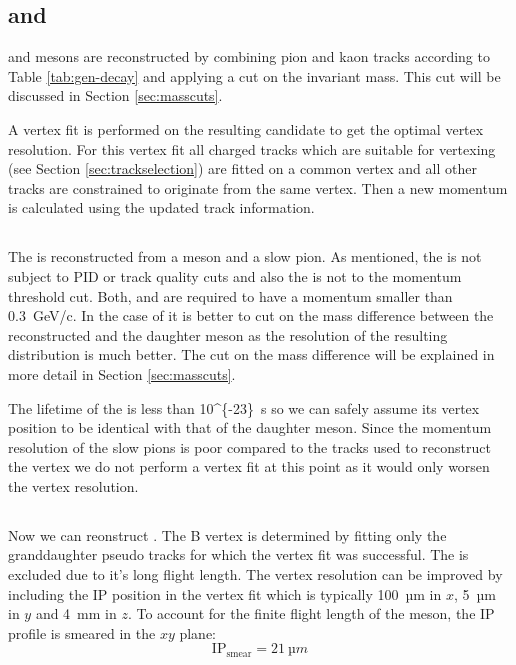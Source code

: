 \documentclass[a4paper]{report}
\begin{document}
\subsection{\PDz and \PDpm}
\PDz and \PDpm mesons are reconstructed by combining pion and kaon tracks
according to Table \ref{tab:gen-decay} and applying a cut on the invariant mass.
This cut will be discussed in Section \ref{sec:masscuts}.

A vertex fit is performed on the resulting \PD candidate to get the optimal
vertex resolution.  For this vertex fit all charged tracks which are suitable
for vertexing (see Section \ref{sec:trackselection}) are fitted on a common
vertex and all other tracks are constrained to originate from the same vertex.
Then a new \PD momentum is calculated using the updated track information.

\subsection{\PDstpm}
The \PDstpm is reconstructed from a \PD meson and a slow pion. As mentioned, the
\Pgppms is not subject to PID or track quality cuts and also the \Pgpzs is not
to the \Pgpz momentum threshold cut. Both, \Pgppms and \Pgpzs are required to
have a momentum smaller than \SI{0.3}{GeV/c}. In the case of \PDstpm it is
better to cut on the mass difference between the reconstructed \PDstpm and the
daughter \PD meson as the resolution of the resulting distribution is much
better. The cut on the mass difference will be explained in more detail in
Section \ref{sec:masscuts}.

The lifetime of the \PDstpm is less than \SI{10^{-23}}{s} so we can safely
assume its vertex position to be identical with that of the daughter \PD meson.
Since the momentum resolution of the slow pions is poor compared to the tracks
used to reconstruct the \PD vertex we do not perform a vertex fit at this point
as it would only worsen the vertex resolution.

\subsection{\PBz}

Now we can reonstruct \ddk. The B vertex is determined by fitting only the
granddaughter \PD pseudo tracks for which the vertex fit was successful. The
\PKzS is excluded due to it's long flight length. The vertex resolution can be
improved by including the IP position in the vertex fit which is typically
\SI{100}{µm} in $x$, \SI{5}{µm} in $y$ and \SI{4}{mm} in $z$. To account for the
finite flight length of the \PB meson, the IP profile is smeared in the
$xy$ plane:
\[ \text{IP}_{\text{smear}} = \SI{21}{µm} \]
\end{document}
